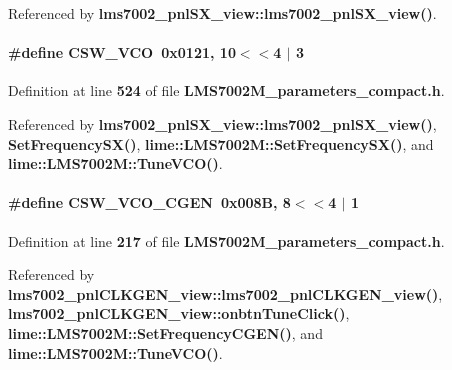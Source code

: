 Referenced by {\bf lms7002\+\_\+pnl\+S\+X\+\_\+view\+::lms7002\+\_\+pnl\+S\+X\+\_\+view()}.

\paragraph[{C\+S\+W\+\_\+\+V\+CO}]{\setlength{\rightskip}{0pt plus 5cm}\#define C\+S\+W\+\_\+\+V\+CO~0x0121, 10$<$$<$4 $\vert$  3}\label{LMS7002M__parameters__compact_8h_ae4f17576982598b110c0c5a77d7942e3}


Definition at line {\bf 524} of file {\bf L\+M\+S7002\+M\+\_\+parameters\+\_\+compact.\+h}.



Referenced by {\bf lms7002\+\_\+pnl\+S\+X\+\_\+view\+::lms7002\+\_\+pnl\+S\+X\+\_\+view()}, {\bf Set\+Frequency\+S\+X()}, {\bf lime\+::\+L\+M\+S7002\+M\+::\+Set\+Frequency\+S\+X()}, and {\bf lime\+::\+L\+M\+S7002\+M\+::\+Tune\+V\+C\+O()}.

\paragraph[{C\+S\+W\+\_\+\+V\+C\+O\+\_\+\+C\+G\+EN}]{\setlength{\rightskip}{0pt plus 5cm}\#define C\+S\+W\+\_\+\+V\+C\+O\+\_\+\+C\+G\+EN~0x008\+B, 8$<$$<$4 $\vert$  1}\label{LMS7002M__parameters__compact_8h_ae83c99e843892620fd69b3bee8de790b}


Definition at line {\bf 217} of file {\bf L\+M\+S7002\+M\+\_\+parameters\+\_\+compact.\+h}.



Referenced by {\bf lms7002\+\_\+pnl\+C\+L\+K\+G\+E\+N\+\_\+view\+::lms7002\+\_\+pnl\+C\+L\+K\+G\+E\+N\+\_\+view()}, {\bf lms7002\+\_\+pnl\+C\+L\+K\+G\+E\+N\+\_\+view\+::onbtn\+Tune\+Click()}, {\bf lime\+::\+L\+M\+S7002\+M\+::\+Set\+Frequency\+C\+G\+E\+N()}, and {\bf lime\+::\+L\+M\+S7002\+M\+::\+Tune\+V\+C\+O()}.


